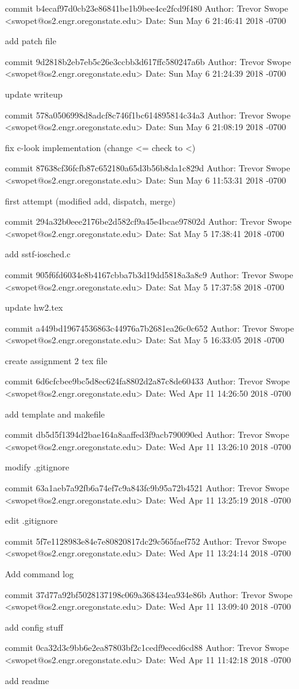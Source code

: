 commit b4ecaf97d0cb23e86841be1b9bee4ce2fcd9f480
Author: Trevor Swope <swopet@os2.engr.oregonstate.edu>
Date:   Sun May 6 21:46:41 2018 -0700

    add patch file

commit 9d2818b2eb7eb5c26e3ccbb3d617ffc580247a6b
Author: Trevor Swope <swopet@os2.engr.oregonstate.edu>
Date:   Sun May 6 21:24:39 2018 -0700

    update writeup

commit 578a0506998d8adcf8c746f1bc614895814c34a3
Author: Trevor Swope <swopet@os2.engr.oregonstate.edu>
Date:   Sun May 6 21:08:19 2018 -0700

    fix c-look implementation (change <= check to <)

commit 87638cf36fcfb87c652180a65d3b56b8da1c829d
Author: Trevor Swope <swopet@os2.engr.oregonstate.edu>
Date:   Sun May 6 11:53:31 2018 -0700

    first attempt (modified add, dispatch, merge)

commit 294a32b0eee2176be2d582cf9a45e4bcae97802d
Author: Trevor Swope <swopet@os2.engr.oregonstate.edu>
Date:   Sat May 5 17:38:41 2018 -0700

    add sstf-iosched.c

commit 905f6fd6034e8b4167cbba7b3d19dd5818a3a8c9
Author: Trevor Swope <swopet@os2.engr.oregonstate.edu>
Date:   Sat May 5 17:37:58 2018 -0700

    update hw2.tex

commit a449bd19674536863c44976a7b2681ea26c0c652
Author: Trevor Swope <swopet@os2.engr.oregonstate.edu>
Date:   Sat May 5 16:33:05 2018 -0700

    create assignment 2 tex file

commit 6d6cfcbee9bc5d8ec624fa8802d2a87c8de60433
Author: Trevor Swope <swopet@os2.engr.oregonstate.edu>
Date:   Wed Apr 11 14:26:50 2018 -0700

    add template and makefile

commit db5d5f1394d2bae164a8aaffed3f9acb790090ed
Author: Trevor Swope <swopet@os2.engr.oregonstate.edu>
Date:   Wed Apr 11 13:26:10 2018 -0700

    modify .gitignore

commit 63a1aeb7a92fb6a74ef7c9a843fc9b95a72b4521
Author: Trevor Swope <swopet@os2.engr.oregonstate.edu>
Date:   Wed Apr 11 13:25:19 2018 -0700

    edit .gitignore

commit 5f7e1128983e84e7e80820817dc29c565faef752
Author: Trevor Swope <swopet@os2.engr.oregonstate.edu>
Date:   Wed Apr 11 13:24:14 2018 -0700

    Add command log

commit 37d77a92bf5028137198c069a368434ea934e86b
Author: Trevor Swope <swopet@os2.engr.oregonstate.edu>
Date:   Wed Apr 11 13:09:40 2018 -0700

    add config stuff

commit 0ca32d3c9bb6e2ea87803bf2c1cedf9eced6cd88
Author: Trevor Swope <swopet@os2.engr.oregonstate.edu>
Date:   Wed Apr 11 11:42:18 2018 -0700

    add readme

